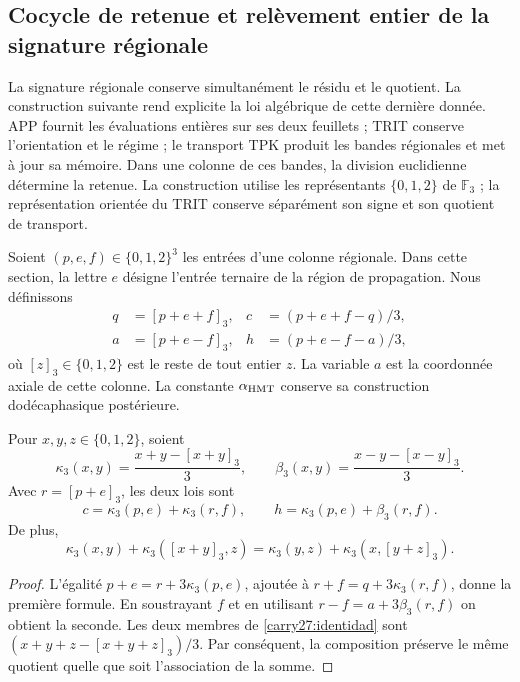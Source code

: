 \subsection{Cocycle de retenue et relèvement entier de la signature régionale}
\label{carry27:seccion}

La signature régionale conserve simultanément le résidu et le quotient.
La construction suivante rend explicite la loi algébrique de cette
dernière donnée. APP fournit les évaluations entières sur ses deux
feuillets ; TRIT conserve l'orientation et le régime ; le transport TPK
produit les bandes régionales et met à jour sa mémoire. Dans une
colonne de ces bandes, la division euclidienne détermine la retenue.
La construction utilise les représentants \(\{0,1,2\}\) de
\(\mathbb F_3\) ; la représentation orientée du TRIT conserve
séparément son signe et son quotient de transport.

Soient \((p,e,f)\in\{0,1,2\}^3\) les entrées d'une colonne régionale. Dans cette section, la lettre \(e\) désigne l'entrée ternaire de la région de propagation. Nous définissons
\begin{equation}
\begin{aligned}
q&=[p+e+f]_3,& c&=(p+e+f-q)/3,\\
a&=[p+e-f]_3,& h&=(p+e-f-a)/3,
\end{aligned}
\label{carry27:division}
\end{equation}
où \([z]_3\in\{0,1,2\}\) est le reste de tout entier \(z\).
La variable \(a\) est la coordonnée axiale de cette colonne. La
constante \(\alpha_{\rm HMT}\) conserve sa construction
dodécaphasique postérieure.

\begin{proposition}
\label{carry27:cociclo}
Pour \(x,y,z\in\{0,1,2\}\), soient
\[
\kappa_3(x,y)=\frac{x+y-[x+y]_3}{3},\qquad
\beta_3(x,y)=\frac{x-y-[x-y]_3}{3}.
\]
Avec \(r=[p+e]_3\), les deux lois sont
\[
c=\kappa_3(p,e)+\kappa_3(r,f),\qquad
h=\kappa_3(p,e)+\beta_3(r,f).
\]
De plus,
\begin{equation}
\kappa_3(x,y)+\kappa_3([x+y]_3,z)
=\kappa_3(y,z)+\kappa_3(x,[y+z]_3).
\label{carry27:identidad}
\end{equation}
\end{proposition}

\begin{proof}
L'égalité \(p+e=r+3\kappa_3(p,e)\), ajoutée à
\(r+f=q+3\kappa_3(r,f)\), donne la première formule.
En soustrayant \(f\) et en utilisant
\(r-f=a+3\beta_3(r,f)\) on obtient la seconde.
Les deux membres de \eqref{carry27:identidad} sont
\((x+y+z-[x+y+z]_3)/3\). Par conséquent, la composition
préserve le même quotient quelle que soit l'association
de la somme.
\end{proof}

